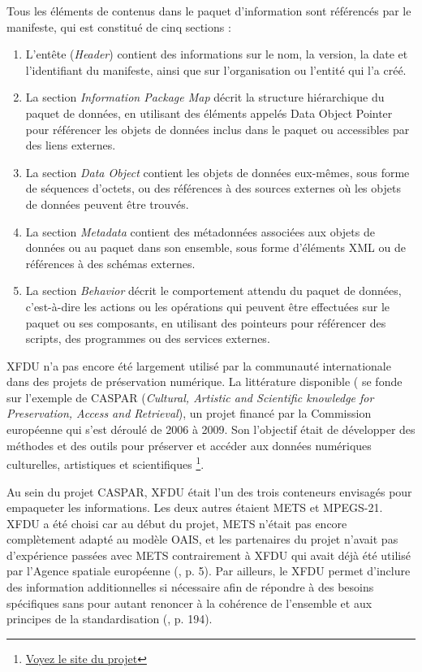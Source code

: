 \documentclass[12pt,a4paper]{article} %
\begin{document}
Tous les éléments de contenus dans le paquet d'information sont référencés par le manifeste, qui est constitué de cinq sections : 
\begin{enumerate}
\item L'entête (\textit{Header}) contient des informations sur le nom, la version, la date et l'identifiant du manifeste, ainsi que sur l'organisation ou l'entité qui l'a créé.
\item La section \textit{Information Package Map} décrit la structure hiérarchique du paquet de données, en utilisant des éléments appelés Data Object Pointer pour référencer les objets de données inclus dans le paquet ou accessibles par des liens externes.
\item La section \textit{Data Object} contient les objets de données eux-mêmes, sous forme de séquences d'octets, ou des références à des sources externes où les objets de données peuvent être trouvés.
\item La section \textit{Metadata} contient des métadonnées associées aux objets de données ou au paquet dans son ensemble, sous forme d'éléments XML ou de références à des schémas externes.
\item La section \textit{Behavior} décrit le comportement attendu du paquet de données, c'est-à-dire les actions ou les opérations qui peuvent être effectuées sur le paquet ou ses composants, en utilisant des pointeurs pour référencer des scripts, des programmes ou des services externes.
\end{enumerate}

XFDU n'a pas encore été largement utilisé par la communauté internationale dans des projets de préservation numérique. La littérature disponible (\autocite{dunckley_using_2010, giaretta_advanced_2011} se fonde sur l'exemple de CASPAR (\textit{Cultural, Artistic and Scientific knowledge for Preservation, Access and Retrieval}), un projet financé par la Commission européenne qui s'est déroulé de 2006 à 2009. Son l'objectif était de développer des méthodes et des outils pour préserver et accéder aux données numériques culturelles, artistiques et scientifiques \footnote{\href{https://www.casparpreserves.eu/}{Voyez le site du projet}}.

Au sein du projet CASPAR, XFDU était l'un des trois conteneurs envisagés pour empaqueter les informations. Les deux autres étaient METS et MPEGS-21. XFDU a été choisi car au début du projet, METS n'était pas encore complètement adapté au modèle OAIS, et les partenaires du projet n'avait pas d'expérience passées avec METS contrairement à XFDU qui avait déjà été utilisé par l'Agence spatiale européenne (\cite{dunckley_using_2010}, p. 5). Par ailleurs, le XFDU permet d'inclure des information additionnelles si nécessaire afin de répondre à des besoins spécifiques sans pour autant renoncer à la cohérence de l'ensemble et aux principes de la standardisation (\cite{giaretta_advanced_2011}, p. 194).
\end{document}
